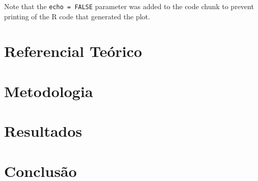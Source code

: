 \documentclass[12pt,english, french, spanish, brazil,a4paper,twoside, openright]{abntex2}	%
\begin{document}
Note that the \texttt{echo\ =\ FALSE} parameter was added to the code
chunk to prevent printing of the R code that generated the plot.

\chapter{Referencial Teórico}

\chapter{Metodologia}

\chapter{Resultados}

\chapter{Conclusão}	%



\printbibliography
\end{document}
